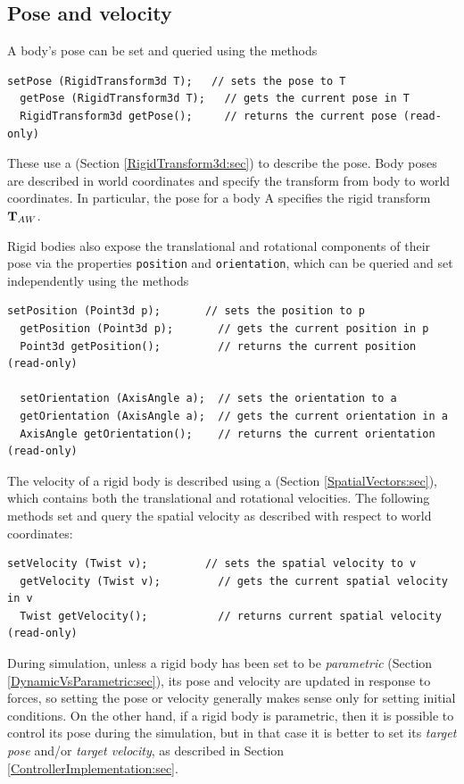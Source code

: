 \subsection{Pose and velocity}

A body's pose can be set and
queried using the methods
%
\begin{lstlisting}[]
  setPose (RigidTransform3d T);   // sets the pose to T
  getPose (RigidTransform3d T);   // gets the current pose in T
  RigidTransform3d getPose();     // returns the current pose (read-only)
\end{lstlisting}
%
These use a  (Section
\ref{RigidTransform3d:sec}) to describe the pose. Body poses are
described in world coordinates and specify the transform from body to
world coordinates. In particular, the pose for a body A specifies
the rigid transform ${\bf T}_{AW}$.

Rigid bodies also expose the translational and rotational components of
their pose via the properties {\tt position} and {\tt orientation},
which can be queried and set independently using the methods
%
\begin{lstlisting}[]
  setPosition (Point3d p);       // sets the position to p
  getPosition (Point3d p);       // gets the current position in p
  Point3d getPosition();         // returns the current position (read-only)

  setOrientation (AxisAngle a);  // sets the orientation to a
  getOrientation (AxisAngle a);  // gets the current orientation in a
  AxisAngle getOrientation();    // returns the current orientation (read-only)
\end{lstlisting}
%

The velocity of a rigid body is described using a
 (Section
\ref{SpatialVectors:sec}), which contains both the translational and
rotational velocities. The following methods
set and query the spatial velocity as described with respect to world
coordinates:
%
\begin{lstlisting}[]
  setVelocity (Twist v);         // sets the spatial velocity to v
  getVelocity (Twist v);         // gets the current spatial velocity in v
  Twist getVelocity();           // returns current spatial velocity (read-only)
\end{lstlisting}
%

During simulation, unless a rigid body has been set to be {\it
parametric} (Section \ref{DynamicVsParametric:sec}), its pose and
velocity are updated in response to forces, so setting the pose or
velocity generally makes sense only for setting initial conditions.
On the other hand, if a rigid body is parametric, then it is possible
to control its pose during the simulation, but in that case it is
better to set its {\it target pose} and/or {\it target velocity}, as
described in Section \ref{ControllerImplementation:sec}.

